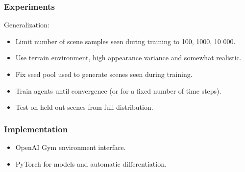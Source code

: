 \begin{frame}
    \frametitle{Experiments}

    Generalization:

    \begin{itemize}
        \item Limit number of scene samples seen during training to 100, 1000, 10 000.
        \item Use terrain environment, high appearance variance and somewhat realistic.
        \item Fix seed pool used to generate scenes seen during training.
        \item Train agents until convergence (or for a fixed number of time steps).
        \item Test on held out scenes from full distribution. 
    \end{itemize}
\end{frame}

\begin{frame}
    \frametitle{Implementation}

    \begin{itemize}
        \item OpenAI Gym environment interface.
        \item PyTorch for models and automatic differentiation.
    \end{itemize}
\end{frame}